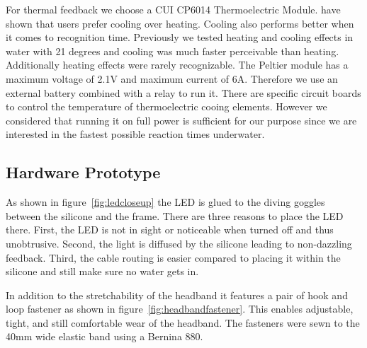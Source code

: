 For thermal feedback we choose a CUI CP6014 Thermoelectric Module. 
\cite{Peiris_thermoVR} have shown that users prefer cooling over heating.
Cooling also performs better when it comes to recognition time.
Previously we tested heating and cooling effects in water with 21 degrees and cooling was much faster perceivable than heating.
Additionally heating effects were rarely recognizable.
The Peltier module has a maximum voltage of 2.1V and maximum current of 6A.
Therefore we use an external battery combined with a relay to run it.
There are specific circuit boards to control the temperature of thermoelectric cooing elements.
However we considered that running it on full power is sufficient for our purpose since we are interested in the fastest possible reaction times underwater.


\subsection{Hardware Prototype}

As shown in figure~\ref{fig:ledcloseup} the LED is glued to the diving goggles between the silicone and the frame.
There are three reasons to place the LED there.
First, the LED is not in sight or noticeable when turned off and thus unobtrusive.
Second, the light is diffused by the silicone leading to non-dazzling feedback.
Third, the cable routing is easier compared to placing it within the silicone and still make sure no water gets in.


In addition to the stretchability of the headband it features  a pair of hook and loop fastener as shown in figure~\ref{fig:headbandfastener}.
This enables adjustable, tight, and still comfortable wear of the headband.
The fasteners were sewn to the 40mm wide elastic band using a Bernina 880.


